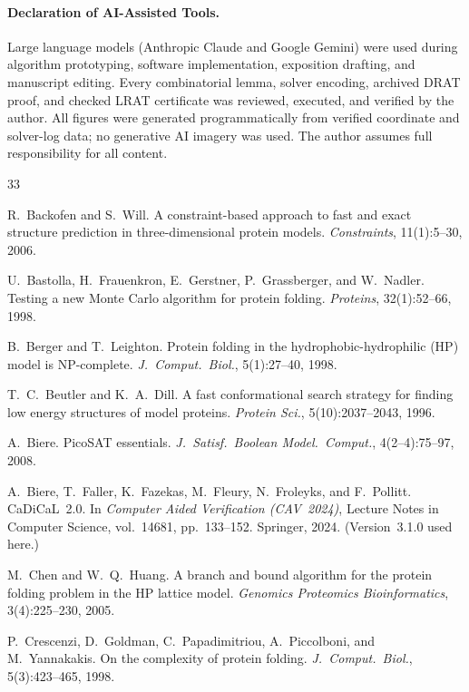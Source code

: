 \documentclass[11pt]{article}
\begin{document}
\paragraph{Declaration of AI-Assisted Tools.}
Large language models (Anthropic Claude and Google Gemini) were used during algorithm prototyping, software implementation, exposition drafting, and manuscript editing. Every combinatorial lemma, solver encoding, archived DRAT proof, and checked LRAT certificate was reviewed, executed, and verified by the author. All figures were generated programmatically from verified coordinate and solver-log data; no generative AI imagery was used. The author assumes full responsibility for all content.

\begin{thebibliography}{33}

R.~Backofen and S.~Will.
A constraint-based approach to fast and exact structure prediction in three-dimensional protein models.
\emph{Constraints}, 11(1):5--30, 2006.

U.~Bastolla, H.~Frauenkron, E.~Gerstner, P.~Grassberger, and W.~Nadler.
Testing a new Monte Carlo algorithm for protein folding.
\emph{Proteins}, 32(1):52--66, 1998.

B.~Berger and T.~Leighton.
Protein folding in the hydrophobic-hydrophilic (HP) model is NP-complete.
\emph{J.\ Comput.\ Biol.}, 5(1):27--40, 1998.

T.~C.~Beutler and K.~A.~Dill.
A fast conformational search strategy for finding low energy structures of model proteins.
\emph{Protein Sci.}, 5(10):2037--2043, 1996.

A.~Biere.
PicoSAT essentials.
\emph{J.\ Satisf.\ Boolean Model.\ Comput.}, 4(2--4):75--97, 2008.

A.~Biere, T.~Faller, K.~Fazekas, M.~Fleury, N.~Froleyks, and F.~Pollitt.
CaDiCaL~2.0.
In \emph{Computer Aided Verification (CAV~2024)}, Lecture Notes in Computer Science, vol.~14681, pp.~133--152. Springer, 2024. (Version~3.1.0 used here.)

M.~Chen and W.~Q.~Huang.
A branch and bound algorithm for the protein folding problem in the HP lattice model.
\emph{Genomics Proteomics Bioinformatics}, 3(4):225--230, 2005.

P.~Crescenzi, D.~Goldman, C.~Papadimitriou, A.~Piccolboni, and M.~Yannakakis.
On the complexity of protein folding.
\emph{J.\ Comput.\ Biol.}, 5(3):423--465, 1998.


\end{thebibliography}
\end{document}
